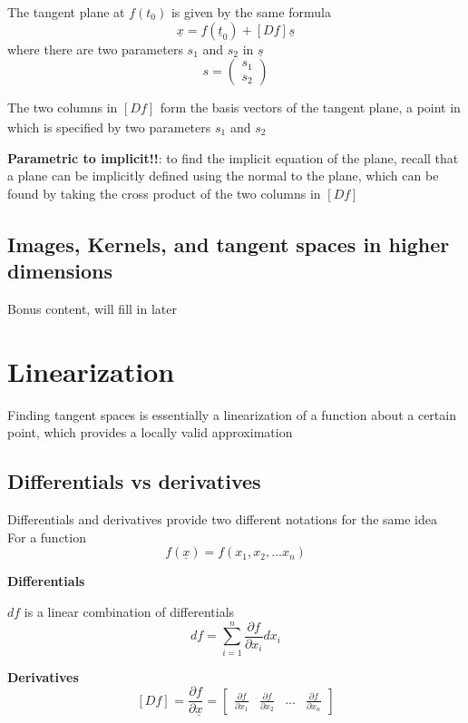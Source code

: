The tangent plane at  $f(t_0)$ is given by the same formula 
\[
  \underline{x} = f( \underline{t}_0) + \left[ D f \right]_{}  \underline{s}
\]
where there are two parameters $s_1$ and $s_2$ in $ \underline{s}$
\[
  s = \begin{pmatrix} s_1 \\ s_2 \end{pmatrix} 
\] 

The two columns in $\left[ Df \right]_{} $ form the basis vectors of the tangent plane, a point in which is specified by two parameters $s_1$ and $s_2$

\textbf{Parametric to implicit!!}: to find the implicit equation of the plane, recall that a plane can be implicitly defined using the normal to the plane, which can be found by taking the cross product of the two columns in $\left[ D f \right]_{} $

\subsection{Images, Kernels, and tangent spaces in higher dimensions}
Bonus content, will fill in later

\section{Linearization}

Finding tangent spaces is essentially a linearization of a function about a certain point, which provides a locally valid approximation

\subsection{Differentials vs derivatives}

Differentials and derivatives provide two different notations for the same idea \\

For a function
\[
  f( \underline{x}) =f(x_1, x_2, \hdots x_n)
\] 

\textbf{Differentials}

$df$ is a linear combination of differentials
\[
   df = \sum_{i=1}^{n} \frac{\partial f}{\partial x_i} dx_i
\] 

\textbf{Derivatives}
\[
\left[ D f \right]_{}  = \frac{\partial f}{\partial \underline{x}} = \begin{bmatrix} 
   \frac{\partial f}{\partial x_1} & \frac{\partial f}{\partial x_2} & \hdots & \frac{\partial f}{\partial x_n}  
\end{bmatrix}
\] 

